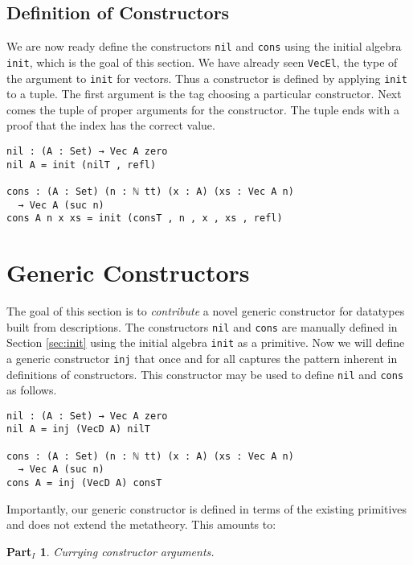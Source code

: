 \documentclass[preprint,nonatbib]{sigplanconf}
\newtheorem{myparti}{Part$_I$}
\newcommand{\refsec}[1]{Section \ref{sec:#1}}
\begin{document}
\subsection{Definition of Constructors}
\label{sec:init:cons}

We are now ready define the constructors {\tt nil} and
{\tt cons} using the initial algebra {\tt init}, which is the goal of
this section.
We have already seen
{\tt VecEl}, the type of the argument to {\tt init} for vectors.
Thus a constructor is defined by applying {\tt init} to a tuple. The
first argument is the tag choosing a particular constructor. Next comes
the tuple of proper arguments for the constructor. The tuple
ends with a proof that the index has the correct value.

\begin{verbatim}
nil : (A : Set) → Vec A zero
nil A = init (nilT , refl)

cons : (A : Set) (n : ℕ tt) (x : A) (xs : Vec A n)
  → Vec A (suc n)
cons A n x xs = init (consT , n , x , xs , refl)
\end{verbatim}

\section{Generic Constructors}
\label{sec:inj}

The goal of this section is to {\it contribute} a novel generic
constructor for datatypes built from descriptions.
The constructors {\tt nil} and {\tt cons} are manually
defined in \refsec{init} using the initial algebra
{\tt init} as a primitive. Now we will define a generic constructor
{\tt inj} that once and for all captures the pattern inherent in
definitions of constructors.  This constructor
may be used to define {\tt nil} and {\tt cons} as follows.

\begin{verbatim}
nil : (A : Set) → Vec A zero
nil A = inj (VecD A) nilT

cons : (A : Set) (n : ℕ tt) (x : A) (xs : Vec A n)
  → Vec A (suc n)
cons A = inj (VecD A) consT
\end{verbatim}

Importantly, our generic constructor is
defined in terms of the existing primitives and does not extend the
metatheory.
This amounts to:

\begin{myparti}
\label{parti:one}
Currying constructor arguments.
\end{myparti}
\end{document}
